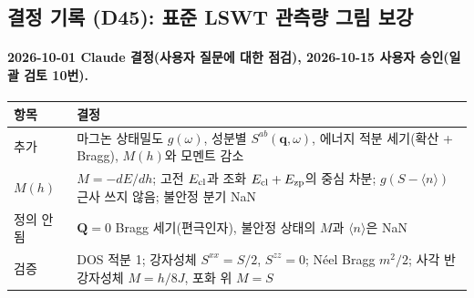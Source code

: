 \subsection{결정 기록 (D45): 표준 LSWT 관측량 그림 보강}\label{decisions-d45-standard}
\begingroup%
  \framesubtitle{2026-10-01 Claude 결정(사용자 질문에 대한 점검), 2026-10-15 사용자 승인(일괄 검토 10번).}
  \small\renewcommand{\arraystretch}{1.12}
  \begin{tabularx}{\textwidth}{@{}P{3.0cm}Y@{}}
    \toprule
    항목 & 결정 \\
    \midrule
    추가 & 마그논 상태밀도 $g(\omega)$, 성분별 $S^{ab}(\mathbf q,\omega)$, 에너지 적분 세기(확산 + Bragg), $M(h)$와 모멘트 감소 \\
    $M(h)$ & $M=-dE/dh$; 고전 $E_{\rm cl}$과 조화 $E_{\rm cl}+E_{\rm zp}$의 중심 차분; $g(S-\langle n\rangle)$ 근사 쓰지 않음; 불안정 분기 NaN \\
    정의 안 됨 & $\mathbf Q=0$ Bragg 세기(편극인자), 불안정 상태의 $M$과 $\langle n\rangle$은 NaN \\
    검증 & DOS 적분 1; 강자성체 $S^{xx}=S/2$, $S^{zz}=0$; Néel Bragg $m^2/2$; 사각 반강자성체 $M=h/8J$, 포화 위 $M=S$ \\
    \bottomrule
  \end{tabularx}
\endgroup


